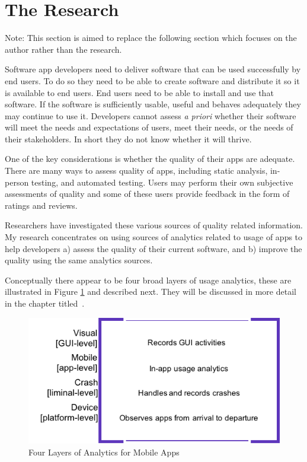 \section{The Research}
Note: This section is aimed to replace the following section \href{my-contributions-in-this-thesis}{\emph{}} which focuses on the author rather than the research.

Software app developers need to deliver software that can be used successfully by end users. To do so they need to be able to create software and distribute it so it is available to end users. End users need to be able to install and use that software. If the software is sufficiently usable, useful and behaves adequately they may continue to use it. Developers cannot assess \emph{a priori} whether their software will meet the needs and expectations of users, meet their needs, or the needs of their stakeholders. In short they do not know whether it will thrive.

One of the key considerations is whether the quality of their apps are adequate. There are many ways to assess quality of apps, including static analysis, in-person testing, and automated testing. Users may perform their own subjective assessments of quality and some of these users provide feedback in the form of ratings and reviews. 

Researchers have investigated these various sources of quality related information. My research concentrates on using sources of analytics related to usage of apps to help developers a) assess the quality of their current software, and b) improve the quality using the same analytics sources.

Conceptually there appear to be four broad layers of usage analytics, these are illustrated in Figure \ref{fig:four-layers-of-analytics-for-mobile-apps} and described next. They will be discussed in more detail in the  chapter titled~\href{chapter-applying-analytics-to-development-practices}{\emph{}}. %

\begin{figure}[ht]
    \centering
    \includegraphics[width=12cm]{images/4-layers-of-analytics.png}
    \caption{Four Layers of Analytics for Mobile Apps}
    \label{fig:four-layers-of-analytics-for-mobile-apps}
\end{figure}

